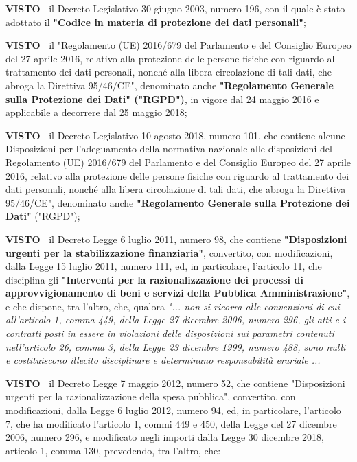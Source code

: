 \documentclass[a4paper,12pt]{letter}
\begin{document}
\textbf{VISTO~}	il Decreto Legislativo 30 giugno 2003, numero 196, con
il quale è stato adottato il \textbf{"Codice in materia di protezione dei dati
personali"};

\textbf{VISTO~}	il "Regolamento (UE) 2016/679 del Parlamento e del
Consiglio Europeo del 27 aprile 2016, relativo alla protezione delle
persone fisiche con riguardo al trattamento dei dati personali, nonché
alla libera circolazione di tali dati, che abroga la Direttiva 95/46/CE",
denominato anche \textbf{"Regolamento Generale sulla Protezione dei Dati"
("RGPD")}, in vigore dal 24 maggio 2016 e applicabile a decorrere dal 25
maggio 2018;

\textbf{VISTO~}	il Decreto Legislativo 10 agosto 2018, numero 101,
che contiene alcune Disposizioni per l’adeguamento della normativa
nazionale alle disposizioni del Regolamento (UE) 2016/679 del Parlamento
e del Consiglio Europeo del 27 aprile 2016, relativo alla protezione
delle persone fisiche con riguardo al trattamento dei dati personali,
nonché alla libera circolazione di tali dati, che abroga la Direttiva
95/46/CE", denominato anche \textbf{"Regolamento Generale sulla Protezione dei
Dati"} ("RGPD");

\textbf{VISTO~}	il Decreto Legge 6 luglio 2011, numero 98, che contiene
\textbf{"Disposizioni urgenti per la stabilizzazione finanziaria"}, convertito,
con modificazioni, dalla Legge 15 luglio 2011, numero 111, ed, in
particolare, l’articolo 11, che disciplina gli \textbf{"Interventi per la
razionalizzazione dei processi di approvvigionamento di beni e servizi
della Pubblica Amministrazione"}, e che dispone, tra l’altro, che,
qualora \textit{"... non si ricorra alle convenzioni di cui all’articolo
1, comma 449, della Legge 27 dicembre 2006, numero 296, gli atti e i
contratti posti in essere in violazioni delle disposizioni sui parametri
contenuti nell’articolo 26, comma 3, della Legge 23 dicembre 1999,
numero 488, sono nulli e costituiscono illecito disciplinare e determinano
responsabilità erariale ...}

\textbf{VISTO~}	il Decreto Legge 7 maggio 2012, numero 52, che contiene
"Disposizioni urgenti per la razionalizzazione della spesa pubblica",
convertito, con modificazioni, dalla Legge 6 luglio 2012, numero 94, ed,
in particolare, l’articolo 7, che ha modificato l’articolo 1, commi
449 e 450, della Legge del 27 dicembre 2006, numero 296, e modificato
negli importi dalla Legge 30 dicembre 2018, articolo 1, comma 130,
prevedendo, tra l’altro, che:
\end{document}
